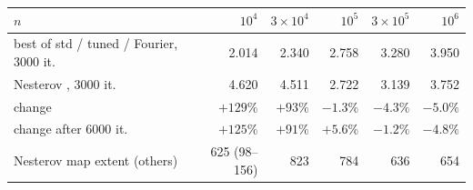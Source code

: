 \begin{tabular}{lrrrrr}\toprule
$n$ & $10^4$ & $3\times10^4$ & $10^5$ & $3\times10^5$ & $10^6$\\\midrule
best of std / tuned / Fourier, 3000 it. & 2.014 & 2.340 & 2.758 & 3.280 & 3.950\\
Nesterov \citep{lambert2023nesterov}, 3000 it. & 4.620 & 4.511 & 2.722 & 3.139 & 3.752\\
change & $+129\%$ & $+93\%$ & $-1.3\%$ & $-4.3\%$ & $-5.0\%$\\
change after 6000 it. & $+125\%$ & $+91\%$ & $+5.6\%$ & $-1.2\%$ & $-4.8\%$\\
Nesterov map extent (others) & 625 (98--156) & 823 & 784 & 636 & 654\\
\bottomrule\end{tabular}
